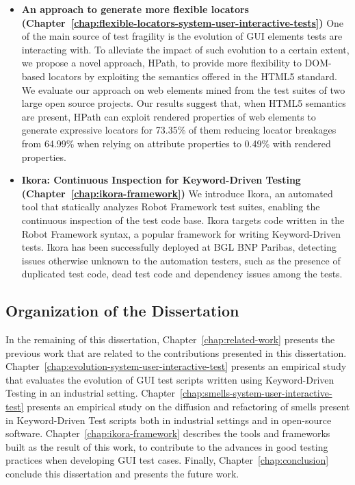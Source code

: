 \begin{itemize}
    \item \textbf{An approach to generate more flexible locators (Chapter~\ref{chap:flexible-locators-system-user-interactive-tests})} One of the main source of test fragility is the evolution of GUI elements tests are interacting with. To alleviate the impact of such evolution to a certain extent, we propose a novel approach, HPath, to provide more flexibility to DOM-based locators by exploiting the semantics offered in the HTML5 standard. We evaluate our approach on web elements mined from the test suites of two large open source projects. Our results suggest that, when HTML5 semantics are present, HPath can exploit rendered properties of web elements to generate expressive locators for 73.35\% of them reducing locator breakages from 64.99\% when relying on attribute properties to 0.49\% with rendered properties.
    
    \item \textbf{Ikora: Continuous Inspection for Keyword-Driven Testing (Chapter~\ref{chap:ikora-framework})} We introduce Ikora, an automated tool that statically analyzes Robot Framework test suites, enabling the continuous inspection of the test code base. Ikora targets code written in the Robot Framework syntax, a popular framework for writing Keyword-Driven tests. Ikora has been successfully deployed at BGL BNP Paribas, detecting issues otherwise unknown to the automation testers, such as the presence of duplicated test code, dead test code and dependency issues among the tests.
\end{itemize}

\subsection{Organization of the Dissertation}

In the remaining of this dissertation, Chapter~\ref{chap:related-work} presents the previous work that are related to the contributions presented in this dissertation. Chapter~\ref{chap:evolution-system-user-interactive-test} presents an empirical study that evaluates the evolution of GUI test scripts written using Keyword-Driven Testing in an industrial setting. Chapter~\ref{chap:smells-system-user-interactive-test} presents an empirical study on the diffusion and refactoring of smells present in Keyword-Driven Test scripts both in industrial settings and in open-source software. Chapter~\ref{chap:ikora-framework} describes the tools and frameworks built as the result of this work, to contribute to the advances in good testing practices when developing GUI test cases. Finally, Chapter~\ref{chap:conclusion} conclude this dissertation and presents the future work.
